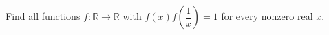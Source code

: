 Find all functions $f:\mathbb R\to\mathbb R$ with $f(x)f(\dfrac{1}{x})=1$ for every nonzero real $x$.
